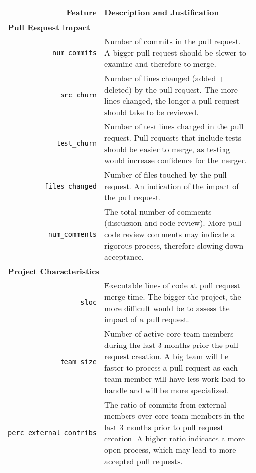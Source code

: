 \documentclass{sig-alternate}
\begin{document}
\begin{table*}
  \begin{small}
  \centering
  \begin{tabular}{rp{40em}}
    \hline
    \bf{Feature} & \bf{Description and Justification}\\
    \hline
    \multicolumn{2}{l}{\bf{Pull Request Impact}}\\
    
    \texttt{num\_commits} & Number of commits in the pull request. A bigger
    pull request should be slower to examine and therefore to merge.\\
    
    \texttt{src\_churn} & Number of lines changed (added + deleted) by the pull
    request. The more lines changed, the longer a pull request should take to be
    reviewed.\\

    \texttt{test\_churn} & Number of test lines changed in the pull request. Pull requests
    that include tests should be easier to merge, as testing would increase
    confidence for the merger.\\
    
    \texttt{files\_changed} & Number of files touched by the pull request. An
    indication of the impact of the pull request.\\
    
    \texttt{num\_comments} & The total number of comments (discussion and code
    review). More pull code review comments may indicate a rigorous process,
    therefore slowing down acceptance.\\

    \multicolumn{2}{l}{\bf{Project Characteristics}}\\
    
    \texttt{sloc} & Executable lines of code at pull request merge time. The
    bigger the project, the more difficult would be to assess the impact of
    a pull request. \\

    \texttt{team\_size} & Number of active core team members during the last
    3 months prior the pull request creation. A big team will be faster to process a
    pull request as each team member will have less work load to handle and
    will be more specialized.\\

    \texttt{perc\_external\_contribs} & The ratio of commits from external
    members over core team members in the last 3 months prior to pull request
    creation. A higher ratio indicates a more open
    process, which may lead to more accepted pull requests.\\


\end{tabular}
\end{small}
\end{table*}
\end{document}
